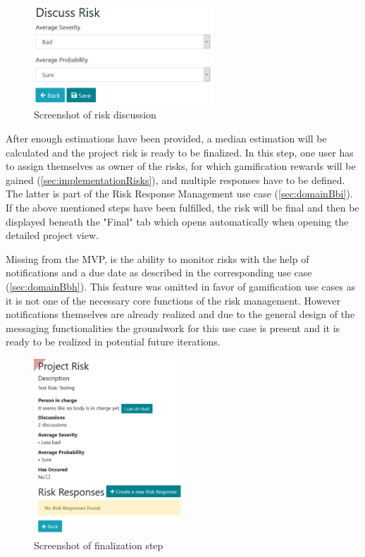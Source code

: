 \begin{figure}[H]
	\centering
	\includegraphics[width=0.6\textwidth]{Assets/implementation_shots/riskdiscussion.png}
	\caption{Screenshot of risk discussion}
	\label{fig:riskdiscussion}
\end{figure}

After enough estimations have been provided, a median estimation will be calculated and the project risk is ready to be finalized. In this step, one user has to assign themselves as owner of the risks, for which gamification rewards will be gained (\ref{sec:implementationRisks}), and multiple responses have to be defined. The latter is part of the Risk Response Management use case (\ref{sec:domainBbi}). If the above mentioned steps have been fulfilled, the risk will be final and then be displayed beneath the "Final" tab which opens automatically when opening the detailed project view.

 Missing from the MVP, is the ability to monitor risks with the help of notifications and a due date as described in the corresponding use case (\ref{sec:domainBbh}). This feature was omitted in favor of gamification use cases as it is not one of the necessary core functions of the risk management. However notifications themselves are already realized and due to the general design of the messaging functionalities the groundwork for this use case is present and it is ready to be realized in potential future iterations.
 
\begin{figure}
	\includegraphics[width=0.5\textwidth]{Assets/implementation_shots/riskfinalization.png}
	\caption{Screenshot of finalization step}
	\label{fig:riskdfinalization}
\end{figure}

